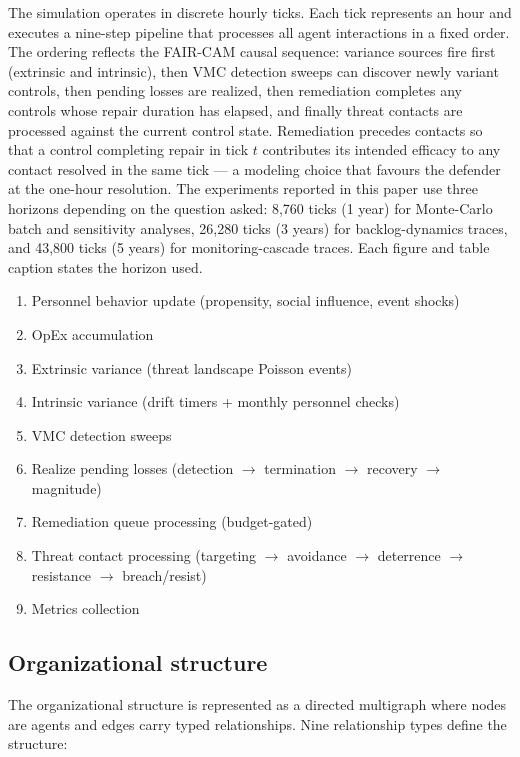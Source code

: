 \documentclass[11pt,a4paper]{article}
\begin{document}
The simulation operates in discrete hourly ticks. Each tick represents an hour and executes a nine-step pipeline that processes all agent interactions in a fixed order. The ordering reflects the FAIR-CAM causal sequence: variance sources fire first (extrinsic and intrinsic), then VMC detection sweeps can discover newly variant controls, then pending losses are realized, then remediation completes any controls whose repair duration has elapsed, and finally threat contacts are processed against the current control state. Remediation precedes contacts so that a control completing repair in tick $t$ contributes its intended efficacy to any contact resolved in the same tick --- a modeling choice that favours the defender at the one-hour resolution. The experiments reported in this paper use three horizons depending on the question asked: 8,760 ticks (1 year) for Monte-Carlo batch and sensitivity analyses, 26,280 ticks (3 years) for backlog-dynamics traces, and 43,800 ticks (5 years) for monitoring-cascade traces. Each figure and table caption states the horizon used.

\begin{enumerate}[nosep]
    \item Personnel behavior update (propensity, social influence, event shocks)
    \item OpEx accumulation
    \item Extrinsic variance (threat landscape Poisson events)
    \item Intrinsic variance (drift timers + monthly personnel checks)
    \item VMC detection sweeps
    \item Realize pending losses (detection $\to$ termination $\to$ recovery $\to$ magnitude)
    \item Remediation queue processing (budget-gated)
    \item Threat contact processing (targeting $\to$ avoidance $\to$ deterrence $\to$ resistance $\to$ breach/\allowbreak resist)
    \item Metrics collection
\end{enumerate}

\subsection{Organizational structure}

The organizational structure is represented as a directed multigraph where nodes are agents and edges carry typed relationships. Nine relationship types define the structure:
\end{document}
